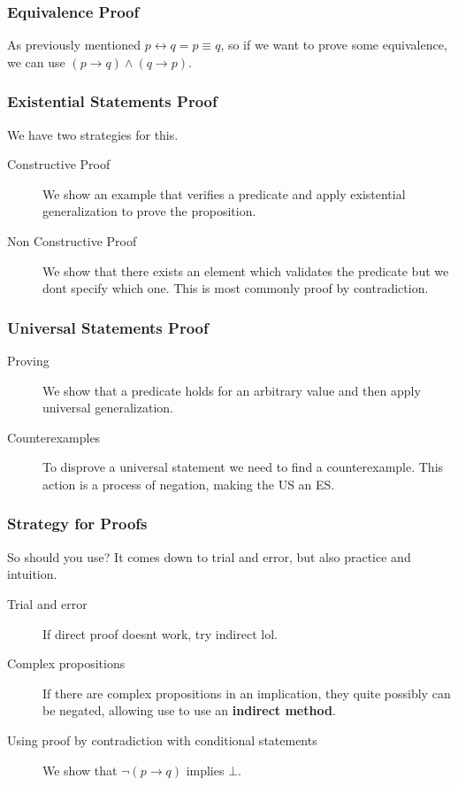 \documentclass[11pt]{article}
\begin{document}
\subsubsection{Equivalence Proof}
\label{sec:orgd985d40}
As previously mentioned \(p \leftrightarrow q = p \equiv q\), so if we want to prove some equivalence, we can use \((p \to q) \land (q \to p)\).
\subsubsection{Existential Statements Proof}
\label{sec:org0da4a04}
We have two strategies for this.
\begin{description}
\item[{Constructive Proof}] We show an example that verifies a predicate and apply existential generalization to prove the proposition.
\item[{Non Constructive Proof}] We show that there exists an element which validates the predicate but we dont specify which one. This is most commonly proof by contradiction.
\end{description}
\subsubsection{Universal Statements Proof}
\label{sec:orgd06713d}
\begin{description}
\item[{Proving}] We show that a predicate holds for an arbitrary value and then apply universal generalization.
\item[{Counterexamples}] To disprove a universal statement we need to find a counterexample. This action is a process of negation, making the US an ES.
\end{description}
\subsubsection{Strategy for Proofs}
\label{sec:orgd0a2692}
So should you use? It comes down to trial and error, but also practice and intuition.
\begin{description}
\item[{Trial and error}] If direct proof doesnt work, try indirect lol.
\item[{Complex propositions}] If there are complex propositions in an implication, they quite possibly can be negated, allowing use to use an \textbf{indirect method}.
\item[{Using proof by contradiction with conditional statements}] We show that \(\neg (p \to q)\) implies \(\bot\).
\end{description}
\end{document}
